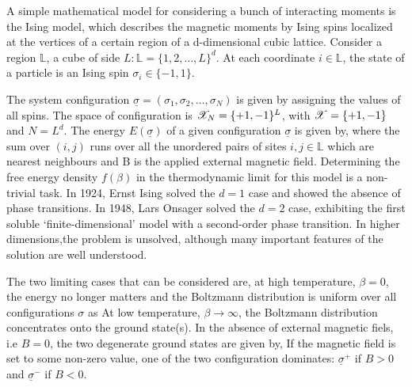 \documentclass[letterpaper,english,10pt]{article}
\begin{document}
A simple mathematical model for considering a bunch of interacting moments is the Ising model, which describes the magnetic moments by Ising spins localized at the vertices of a certain region of a d-dimensional cubic lattice. Consider a region $\mathbb{L}$, a cube of side $L:\mathbb{L}=\{1,2, \dots, L\}^d$. At each coordinate $i \in \mathbb{L}$, the state of a particle is an Ising spin $\sigma_i \in \{-1,1\}$.


The system configuration $\underline{\sigma} = (\sigma_1, \sigma_2, \dots, \sigma_N)$ is given by assigning the values of all spins. The space of configuration is $\mathscr{X}_N = \{+1,-1\}^L$, with $\mathscr{X}= \{+1,-1\}$ and $N=L^d$.
The energy $E(\underline{\sigma})$ of a given configuration $\underline{\sigma}$ is given by,
where the sum over $(i,j)$ runs over all the unordered pairs of sites $i,j \in \mathbb{L}$ which are nearest neighbours and B is the applied external magnetic field.
Determining the free energy density $f(\beta)$ in the thermodynamic limit for this model is a non-trivial task. In 1924, Ernst Ising solved the $d=1$ case and showed the absence of phase transitions. In 1948, Lars Onsager solved the $d=2$ case, exhibiting the first soluble ‘finite-dimensional’ model with a second-order phase transition. In higher dimensions,the problem is unsolved, although many important features of the solution are well understood.

The two limiting cases that can be considered are, at high temperature, $\beta=0$, the energy no longer matters and the Boltzmann distribution is uniform over all configurations $\sigma$ as
At low temperature, $\beta \to \infty$, the Boltzmann distribution concentrates onto the ground state(s). In the absence of external magnetic fiels, i.e $B=0$, the two degenerate ground states are given by,
If the magnetic field is set to some non-zero value, one of the two configuration dominates: $\underline{\sigma}^+$ if $B>0$ and $\underline{\sigma}^-$ if $B<0$.
\end{document}
